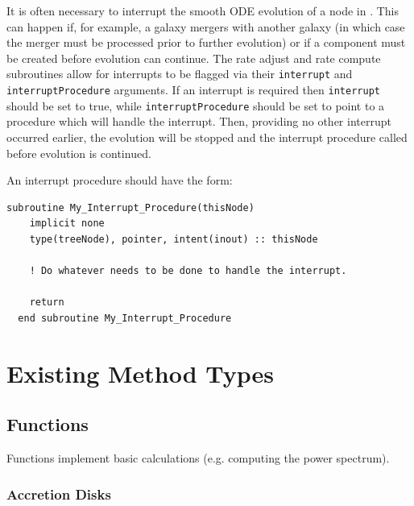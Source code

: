 It is often necessary to interrupt the smooth ODE evolution of a node in \glc. This can happen if, for example, a galaxy mergers with another galaxy (in which case the merger must be processed prior to further evolution) or if a component must be created before evolution can continue. The rate adjust and rate compute subroutines allow for interrupts to be flagged via their {\tt interrupt} and {\tt interruptProcedure} arguments. If an interrupt is required then {\tt interrupt} should be set to true, while {\tt interruptProcedure} should be set to point to a procedure which will handle the interrupt. Then, providing no other interrupt occurred earlier, the evolution will be stopped and the interrupt procedure called before evolution is continued.

An interrupt procedure should have the form:
\begin{lstlisting}[escapechar=@,breaklines,prebreak=\&,postbreak=\&]
  subroutine My_Interrupt_Procedure(thisNode)
    implicit none
    type(treeNode), pointer, intent(inout) :: thisNode
  
    ! Do whatever needs to be done to handle the interrupt.

    return
  end subroutine My_Interrupt_Procedure
\end{lstlisting}

\section{Existing Method Types}

\subsection{Functions}

Functions implement basic calculations (e.g. computing the power spectrum).

\subsubsection{Accretion Disks}\label{sec:AccretionDisks}

